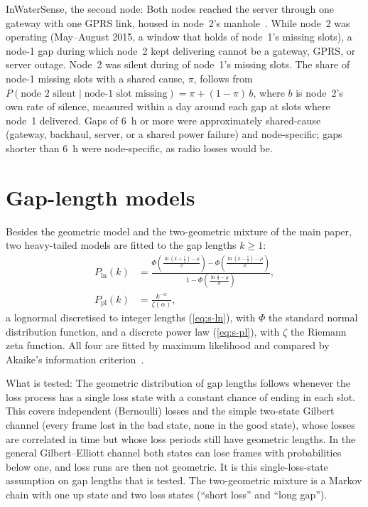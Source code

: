 \documentclass[journal]{IEEEtran}
\begin{document}
InWaterSense, the second node: Both nodes reached the server through one gateway with one GPRS link, housed in node~2's manhole~\cite{ahmedi2022dataset}. While node~2 was operating (May--August 2015, a window that holds \inwsWindowShare{} of node~1's missing slots), a node-1 gap during which node~2 kept delivering cannot be a gateway, GPRS, or server outage. Node~2 was silent during \inwsNodeTwoSilent{} of node~1's missing slots. The share of node-1 missing slots with a shared cause, $\pi$, follows from $P(\text{node 2 silent}\mid\text{node-1 slot missing})=\pi+(1-\pi)\,b$, where $b$ is node~2's own rate of silence, measured within a day around each gap at slots where node~1 delivered. Gaps of 6~h or more were approximately \inwsSharedLong{} shared-cause (gateway, backhaul, server, or a shared power failure) and \inwsSpecificLong{} node-specific; gaps shorter than 6~h were \inwsSpecificShort{} node-specific, as radio losses would be.

\section{Gap-length models}
\label{sec:s-models}
Besides the geometric model and the two-geometric mixture of the main paper, two heavy-tailed models are fitted to the gap lengths $k\ge1$:
\begin{align}
P_\mathrm{ln}(k)&=\frac{\Phi\!\left(\frac{\ln(k+\frac12)-\mu}{\sigma}\right)-\Phi\!\left(\frac{\ln(k-\frac12)-\mu}{\sigma}\right)}{1-\Phi\!\left(\frac{\ln\frac12-\mu}{\sigma}\right)}, \label{eq:s-ln}\\
P_\mathrm{pl}(k)&=\frac{k^{-\alpha}}{\zeta(\alpha)}, \label{eq:s-pl}
\end{align}
a lognormal discretised to integer lengths (\ref{eq:s-ln}), with $\Phi$ the standard normal distribution function, and a discrete power law (\ref{eq:s-pl}), with $\zeta$ the Riemann zeta function. All four are fitted by maximum likelihood and compared by Akaike's information criterion~\cite{akaike1974aic}.

What is tested: The geometric distribution of gap lengths follows whenever the loss process has a single loss state with a constant chance of ending in each slot. This covers independent (Bernoulli) losses and the simple two-state Gilbert channel (every frame lost in the bad state, none in the good state), whose losses are correlated in time but whose loss periods still have geometric lengths. In the general Gilbert--Elliott channel both states can lose frames with probabilities below one, and loss runs are then not geometric. It is this single-loss-state assumption on gap lengths that is tested. The two-geometric mixture is a Markov chain with one up state and two loss states (``short loss'' and ``long gap'').
\end{document}
